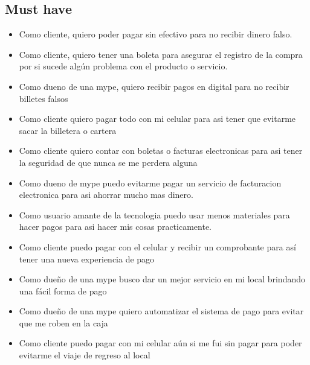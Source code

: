 \documentclass{article}
\begin{document}
\subsection{Must have}
\begin{itemize}
    \item Como cliente, quiero poder pagar sin efectivo para no recibir dinero falso.   
    \item Como cliente, quiero tener una boleta para asegurar el registro de la compra por si sucede algún problema con el producto o servicio.
    \item Como dueno de una mype, quiero recibir pagos en digital para no recibir billetes falsos
    \item Como cliente quiero pagar todo con mi celular para asi tener que evitarme sacar la billetera o cartera
    \item Como cliente quiero contar con boletas o facturas electronicas para asi tener la seguridad de que nunca se me perdera alguna
    \item Como dueno de mype puedo evitarme pagar un servicio de facturacion electronica para asi ahorrar mucho mas dinero.
    \item Como usuario amante de la tecnologia puedo usar menos materiales para hacer pagos para asi hacer mis cosas practicamente.
    \item Como cliente puedo pagar con el celular y recibir un comprobante para así tener una nueva experiencia de pago
    \item Como dueño de una mype busco dar un mejor servicio en mi local brindando una fácil forma de pago
    \item Como dueño de una mype quiero automatizar el sistema de pago para evitar que me roben en la caja
    \item Como cliente puedo pagar con mi celular aún si me fui sin pagar para poder evitarme el viaje de regreso al local



    
\end{itemize}
\end{document}
